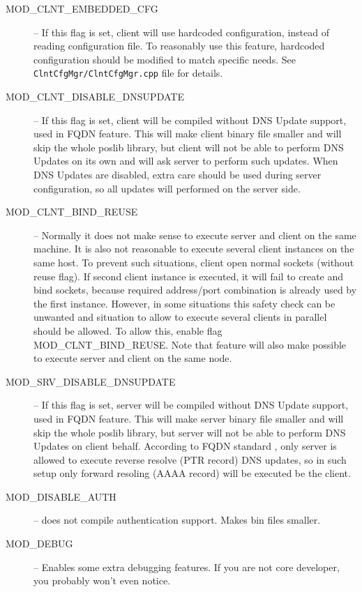 \begin{description}
 \item[MOD\_CLNT\_EMBEDDED\_CFG] -- If this flag is set, client will use
  hardcoded configuration, instead of reading configuration file. To
  reasonably use this feature, hardcoded configuration should be
  modified to match specific needs. See \verb+ClntCfgMgr/ClntCfgMgr.cpp+
  file for details.
 \item[MOD\_CLNT\_DISABLE\_DNSUPDATE] -- If this flag is set, client will
  be compiled without DNS Update support, used in FQDN feature. This
  will make client binary file smaller and will skip the whole poslib
  library, but client will not be able to perform DNS Updates on its own
  and will ask server to perform such updates. When DNS Updates are
  disabled, extra care should be used during server configuration, so
  all updates will performed on the server side.
 \item[MOD\_CLNT\_BIND\_REUSE] -- Normally it does not make sense to
  execute server and client on the same machine. It is also not
  reasonable to execute several client instances on the same host. To
  prevent such situations, client open normal sockets (without reuse
  flag). If second client instance is executed, it will fail to create
  and bind sockets, because required address/port combination is already
  used by the first instance. However, in some situations this safety
  check can be unwanted and situation to allow to execute several
  clients in parallel should be allowed. To allow this, enable flag
  MOD\_CLNT\_BIND\_REUSE. Note that feature will also make possible to
  execute server and client on the same node.
 \item[MOD\_SRV\_DISABLE\_DNSUPDATE] -- If this flag is set, server will
  be compiled without DNS Update support, used in FQDN feature. This
  will make server binary file smaller and will skip the whole poslib
  library, but server will not be able to perform DNS Updates on client
  behalf. According to FQDN standard \cite{rfc4704}, only server is allowed
  to execute reverse resolve (PTR record) DNS updates, so in such setup
  only forward resoling (AAAA record) will be executed be the client.
\item[MOD\_DISABLE\_AUTH] -- does not compile authentication
  support. Makes bin files smaller.
\item[MOD\_DEBUG] -- Enables some extra debugging features. If you are
  not core developer, you probably won't even notice.
\end{description}

